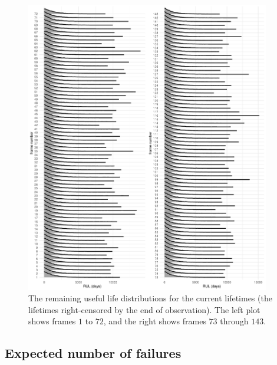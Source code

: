 \begin{figure}[tbp]
  \centering
  \includegraphics[width=0.95\textwidth]{./figures/ch-3/posterior-FTs.pdf}
  \caption{The remaining useful life distributions for the current lifetimes (the lifetimes right-censored by the end of observation). The left plot shows frames $1$ to $72$, and the right shows frames $73$ through $143$.}
  \label{fig:idler-FTs}
\end{figure}

\subsection{Expected number of failures} \label{subsec:idler-cumulative-failrues}

